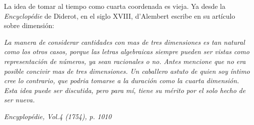 La idea de tomar al tiempo como cuarta coordenada es vieja. Ya desde la \emph{Encyclopédie} de Diderot, en
el siglo XVIII, d'Alembert escribe en su artículo sobre dimensión:

\emph{La manera de considerar cantidades con mas de tres dimensiones es tan natural como los otros casos,
porque las letras algebraicas siempre pueden ser vistas como representación de números, ya sean racionales
o no. Antes mencione que no era posible concivir mas de tres dimensiones. Un caballero astuto de quien soy
íntimo cree lo contrario, que podria tomarse a la duración como la cuarta dimensión. Esta idea puede ser
discutida, pero para mí, tiene su mérito por el solo hecho de ser nueva.}

\begin{flushright}
    \emph{Encyplopédie, Vol.4 (1754), p. 1010}
\end{flushright}





